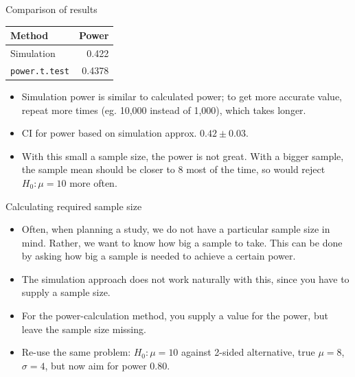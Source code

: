 \documentclass[
  ignorenonframetext,
]{beamer}
\providecommand{\tightlist}{%
  \setlength{\itemsep}{0pt}\setlength{\parskip}{0pt}}
\begin{document}
\begin{frame}{Comparison of results}
\protect\hypertarget{comparison-of-results}{}

\begin{center}
  \begin{tabular}{lr}
    Method & Power\\
    \hline
    Simulation & 0.422\\
    \texttt{power.t.test} & 0.4378\\
    \hline
  \end{tabular}
    
  \end{center}

\begin{itemize}
\tightlist
\item
  Simulation power is similar to calculated power; to get more accurate
  value, repeat more times (eg. 10,000 instead of 1,000), which takes
  longer.
\item
  CI for power based on simulation approx. \(0.42 \pm 0.03\).
\item
  With this small a sample size, the power is not great. With a bigger
  sample, the sample mean should be closer to 8 most of the time, so
  would reject \(H_0 : \mu = 10\) more often.
\end{itemize}

\end{frame}

\begin{frame}{Calculating required sample size}
\protect\hypertarget{calculating-required-sample-size}{}

\begin{itemize}
\tightlist
\item
  Often, when planning a study, we do not have a particular sample size
  in mind. Rather, we want to know how big a sample to take. This can be
  done by asking how big a sample is needed to achieve a certain power.
\item
  The simulation approach does not work naturally with this, since you
  have to supply a sample size.
\item
  For the power-calculation method, you supply a value for the power,
  but leave the sample size missing.
\item
  Re-use the same problem: \(H_0 : \mu = 10\) against 2-sided
  alternative, true \(\mu = 8\), \(\sigma = 4\), but now aim for power
  0.80.
\end{itemize}

\end{frame}
\end{document}
